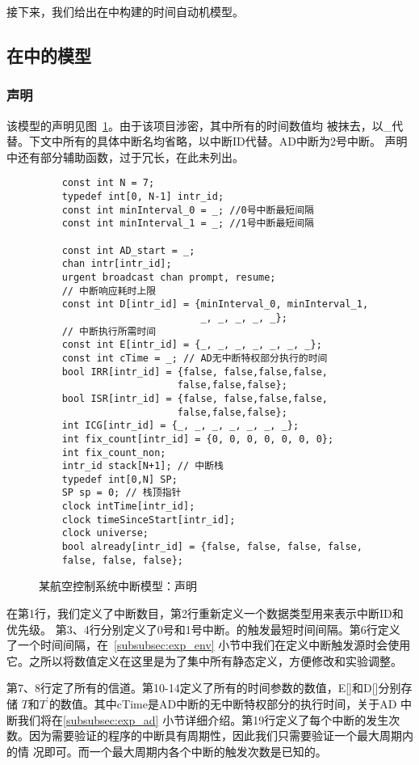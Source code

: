接下来，我们给出在\uppaal 中构建的时间自动机模型。

\subsection{在\uppaal 中的模型}
\label{subsec:model}

\subsubsection{声明}
\label{subsubsec:exp_decl}

该模型的声明见图~\ref{fig:exp_decl}。由于该项目涉密，其中所有的时间数值均
被抹去，以\_代替。下文中所有的具体中断名均省略，以中断ID代替。AD中断为2号中断。
声明中还有部分辅助函数，过于冗长，在此未列出。

\begin{figure}[H]
	\centering
	\begin{lstlisting}
	const int N = 7;
	typedef int[0, N-1] intr_id; 	
	const int minInterval_0 = _; //0号中断最短间隔
	const int minInterval_1 = _; //1号中断最短间隔	

	const int AD_start = _; 	
	chan intr[intr_id];
	urgent broadcast chan prompt, resume;	
	// 中断响应耗时上限
	const int D[intr_id] = {minInterval_0, minInterval_1, 
							_, _, _, _, _};
	// 中断执行所需时间 
	const int E[intr_id] = {_, _, _, _, _, _, _}; 
	const int cTime = _; // AD无中断特权部分执行的时间
	bool IRR[intr_id] = {false, false,false,false,
						false,false,false};
	bool ISR[intr_id] = {false, false,false,false,
						false,false,false};
	int ICG[intr_id] = {_, _, _, _, _, _, _}; 
	int fix_count[intr_id] = {0, 0, 0, 0, 0, 0, 0};
	int fix_count_non;	
	intr_id stack[N+1]; // 中断栈
	typedef int[0,N] SP;
	SP sp = 0; // 栈顶指针
	clock intTime[intr_id];
	clock timeSinceStart[intr_id];
	clock universe;	
	bool already[intr_id] = {false, false, false, false, 
	false, false, false};
	\end{lstlisting}
	\caption{某航空控制系统中断模型：声明}
	\label{fig:exp_decl}
\end{figure}

在第1行，我们定义了中断数目，第2行重新定义一个数据类型用来表示中断ID和优先级。
第3、4行分别定义了0号和1号中断。的触发最短时间间隔。第6行定义
了一个时间间隔，在~\ref{subsubsec:exp_env} 小节中我们在定义中断触发源时会使用
它。之所以将数值定义在这里是为了集中所有静态定义，方便修改和实验调整。

第7、8行定了所有的信道。第10-14定义了所有的时间参数的数值，E[]和D[]分别存储
$T$和$T^\prime$的数值。其中cTime是AD中断的无中断特权部分的执行时间，关于AD
中断我们将在\ref{subsubsec:exp_ad} 小节详细介绍。第19行定义了每个中断的发生次
数。因为需要验证的程序的中断具有周期性，因此我们只需要验证一个最大周期内的情
况即可。而一个最大周期内各个中断的触发次数是已知的。

